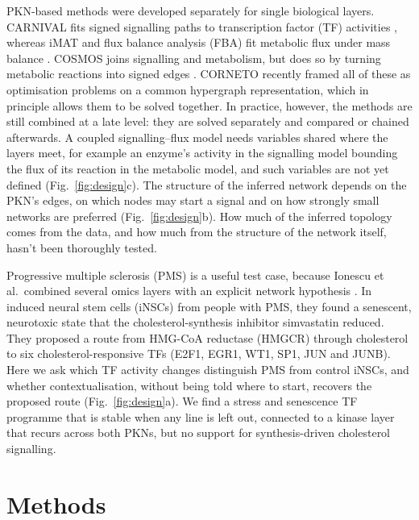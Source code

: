 \documentclass[11pt, a4paper]{article}
\begin{document}
PKN-based methods were developed separately for single biological layers. CARNIVAL fits signed
signalling paths to transcription factor (TF) activities \cite{liu2019carnival}, whereas iMAT and
flux balance analysis (FBA) fit metabolic flux under mass balance \cite{shlomi2008imat,orth2010fba}.
COSMOS joins signalling and metabolism, but does so by turning metabolic reactions into signed
edges \cite{dugourd2021cosmos}. CORNETO \cite{rodriguezmier2025corneto} recently framed all of these
as optimisation problems on a common hypergraph representation, which in principle allows them to be
solved together. In practice, however, the methods are still combined at a late level: they are
solved separately and compared or chained afterwards. A coupled signalling--flux model needs variables shared
where the layers meet, for example an enzyme's activity in the signalling model bounding the flux
of its reaction in the metabolic model, and such variables are not yet defined
(Fig.~\ref{fig:design}c). The structure of the inferred network depends on the PKN's edges, on which nodes may start a signal and on how
strongly small networks are preferred (Fig.~\ref{fig:design}b). How much of the inferred topology
comes from the data, and how much from the structure of the network itself, hasn't been thoroughly tested.

Progressive multiple sclerosis (PMS) is a useful test case, because Ionescu et al.\ combined several
omics layers with an explicit network hypothesis \cite{ionescu2024}. In induced neural stem cells
(iNSCs) from people with PMS, they found a senescent, neurotoxic state that the
cholesterol-synthesis inhibitor simvastatin reduced. They proposed a route from HMG-CoA reductase
(HMGCR) through cholesterol to six cholesterol-responsive TFs (E2F1, EGR1, WT1, SP1, JUN and JUNB).
Here we ask which TF activity changes distinguish PMS from control iNSCs, and whether
contextualisation, without being told where to start, recovers the proposed route
(Fig.~\ref{fig:design}a). We find a stress and senescence TF programme that is stable when any
line is left out, connected to a kinase layer that recurs across both PKNs, but no support for
synthesis-driven cholesterol signalling.

\section{Methods}
\end{document}
